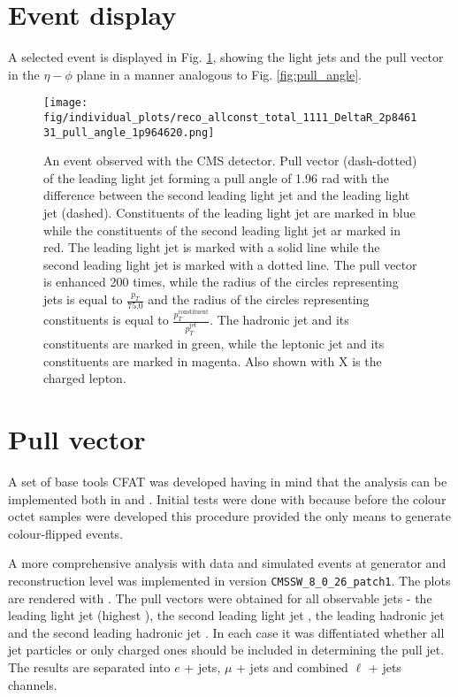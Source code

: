 \label{chap:results}
\section{Event display}
A selected event is displayed in Fig. \ref{fig:event_display}, showing the light jets and the pull vector in the $\eta - \phi$ plane in a manner analogous to Fig. \ref{fig:pull_angle}.

\begin{figure}[hbtp]
  \centering
  \texttt{[image: fig/individual\_plots/reco\_allconst\_total\_1111\_DeltaR\_2p846131\_pull\_angle\_1p964620.png]}
  \caption{An event observed with the CMS detector. Pull vector (dash-dotted) of the leading light jet forming a pull angle of 1.96 rad with the difference between the second leading light jet and the leading light jet (dashed). Constituents of the leading light jet are marked in blue while the constituents of the second leading light jet ar marked in red. The leading light jet is marked with a solid line while the second leading light jet is marked with a dotted line. The pull vector is enhanced 200 times, while the radius of the circles representing jets is equal to $\frac{p_{T}}{75.0}$ and the radius of the circles representing constituents is equal to $\frac{p^{\text{constituent}}_{T}}{p^{\text{jet}}_{T}}$. The hadronic \cPqb jet and its constituents are marked in green, while the leptonic \cPqb jet and its constituents are marked in magenta. Also shown with X is the charged lepton.}
  \label{fig:event_display}
\end{figure}

\section{Pull vector}

A set of base tools \textsc{CFAT} \cite{url:cfat} was developed having in mind that the analysis can be implemented both in \RIVET and \CMSSW. Initial tests were done with \RIVET because before the colour octet \PW samples were developed this procedure provided the only means to generate colour-flipped events.

A more comprehensive analysis with data and simulated events at generator and reconstruction level was implemented in \CMSSW version \lstinline[language=sh]|CMSSW_8_0_26_patch1|. The plots are rendered with \ROOT \cite{Brun}. The pull vectors were obtained for all observable jets - the leading light jet \leadingjet (highest \pt), the second leading light jet \scndleadingjet, the leading hadronic \cPqb jet \leadingb and the second leading hadronic \cPqb jet \scndleadingb. In each case it was diffentiated whether all jet particles or only charged ones should be included in determining the pull jet. The results are separated into $e$ + jets, $\mu$ + jets and combined $\ell$ + jets channels.

